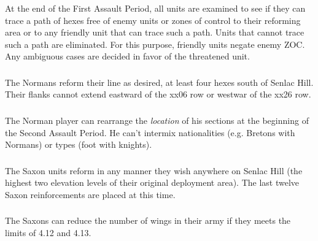 \subsubsection[Reforming Area]{} At the end of the First Assault Period, all units are examined to see if they can trace a path of hexes free of enemy units or zones of control to their reforming area or to any friendly unit that can trace such a path. Units that cannot trace such a path are eliminated. For this purpose, friendly units negate enemy ZOC. Any ambiguous cases are decided in favor of the threatened unit.

\subsubsection[Norman Reform]{} The Normans reform their line as desired, at least four hexes south of Senlac Hill. Their flanks cannot extend eastward of the xx06 row or westwar of the xx26 row.

\subsubsection[Norman Rearrangement]{} The Norman player can rearrange the \textit{location} of his sections at the beginning of the Second Assault Period. He can't intermix nationalities (e.g. Bretons with Normans) or types (foot with knights).

\subsubsection[Saxon Reform]{} The Saxon units reform in any manner they wish anywhere on Senlac Hill (the highest two elevation levels of their original deployment area). The last twelve Saxon reinforcements are placed at this time.

\subsubsection[Saxon Reduction]{} The Saxons can reduce the number of wings in their army if they meets the limits of 4.12 and 4.13.